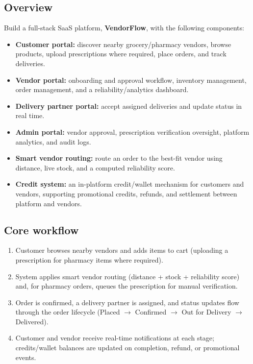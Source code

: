 \documentclass{article}
\begin{document}
\subsection{Overview}
Build a full-stack SaaS platform, \textbf{VendorFlow}, with the following components:
\begin{itemize}
    \item \textbf{Customer portal:} discover nearby grocery/pharmacy vendors, browse products,
    upload prescriptions where required, place orders, and track deliveries.
    \item \textbf{Vendor portal:} onboarding and approval workflow, inventory management, order
    management, and a reliability/analytics dashboard.
    \item \textbf{Delivery partner portal:} accept assigned deliveries and update status in
    real time.
    \item \textbf{Admin portal:} vendor approval, prescription verification oversight, platform
    analytics, and audit logs.
    \item \textbf{Smart vendor routing:} route an order to the best-fit vendor using distance,
    live stock, and a computed reliability score.
    \item \textbf{Credit system:} an in-platform credit/wallet mechanism for customers and
    vendors, supporting promotional credits, refunds, and settlement between platform and
    vendors.
\end{itemize}

\subsection{Core workflow}
\begin{enumerate}
    \item Customer browses nearby vendors and adds items to cart (uploading a prescription for
    pharmacy items where required).
    \item System applies smart vendor routing (distance + stock + reliability score) and, for
    pharmacy orders, queues the prescription for manual verification.
    \item Order is confirmed, a delivery partner is assigned, and status updates flow through
    the order lifecycle (Placed $\rightarrow$ Confirmed $\rightarrow$ Out for Delivery
    $\rightarrow$ Delivered).
    \item Customer and vendor receive real-time notifications at each stage; credits/wallet
    balances are updated on completion, refund, or promotional events.
\end{enumerate}
\end{document}
